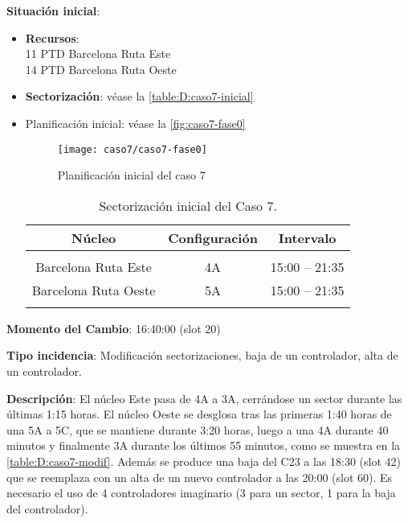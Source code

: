 \textbf{Situación inicial}:
\begin{itemize}[label={}]
	
	\item \textbf{Recursos}: \\
	11 PTD Barcelona Ruta Este \\
	14 PTD Barcelona Ruta Oeste
	
	
	\item \textbf{Sectorización}: véase la \autoref{table:D:caso7-inicial}
	
	\item Planificación inicial: véase la \autoref{fig:caso7-fase0}
	
	\begin{figure}[!h]
		\centering
		\texttt{[image: caso7/caso7-fase0]}
		\caption{Planificación inicial del caso 7}
		\label{fig:caso7-fase0}
	\end{figure}

	\begin{table}[h]
		\centering
		\caption{Sectorización inicial del Caso 7.}
		\label{table:D:caso7-inicial}
		\begin{tabular}{ccc}
			\hline
			\multicolumn{1}{c}{\textbf{Núcleo}} & \multicolumn{1}{c}{\textbf{Configuración}} & \multicolumn{1}{c}{\textbf{Intervalo}} \\ \hline
			&                                            &                                        \\
			Barcelona Ruta Este                 & 4A                                         & 15:00 -- 21:35                         \\
			Barcelona Ruta   Oeste              & 5A                                         & 15:00 -- 21:35                         \\
			\multicolumn{1}{c}{}                &                                            &                                        \\ \hline
		\end{tabular}
	\end{table}
\end{itemize}

\textbf{Momento del Cambio}: 16:40:00 (slot 20)

\textbf{Tipo incidencia}: Modificación sectorizaciones, baja de un controlador, alta de un controlador.

\textbf{Descripción}: El núcleo Este pasa de 4A a 3A, cerrándose un sector durante las últimas 1:15 horas. El núcleo Oeste se desglosa tras las primeras 1:40 horas de una 5A a 5C, que se mantiene durante 3:20 horas, luego a una 4A durante 40 minutos y finalmente 3A durante los últimos 55 minutos, como se muestra en la \autoref{table:D:caso7-modif}. Además se produce una baja del C23 a las 18:30 (slot 42) que se reemplaza con un alta de un nuevo controlador a las 20:00 (slot 60). Es necesario el uso de 4 controladores imaginario (3 para un sector, 1 para la baja del controlador).

